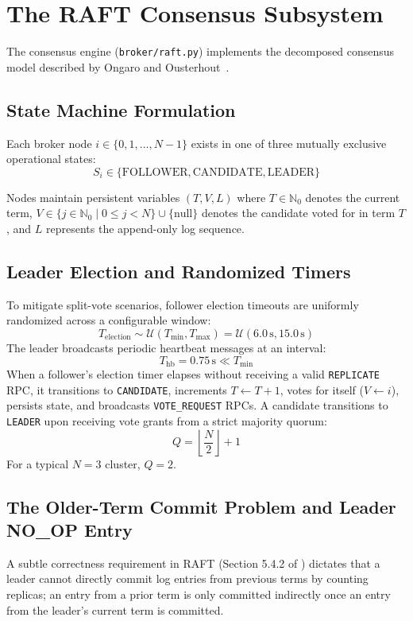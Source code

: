 \documentclass[11pt,a4paper]{article}
\begin{document}
\section{The RAFT Consensus Subsystem}
\label{sec:raft}
The consensus engine (\texttt{broker/raft.py}) implements the decomposed consensus model described by Ongaro and Ousterhout~\cite{ongaro2014raft}.

\subsection{State Machine Formulation}
Each broker node $i \in \{0, 1, \dots, N-1\}$ exists in one of three mutually exclusive operational states:
\begin{equation}
S_i \in \{\text{FOLLOWER}, \text{CANDIDATE}, \text{LEADER}\}
\end{equation}

Nodes maintain persistent variables $(T, V, L)$ where $T \in \mathbb{N}_0$ denotes the current term, $V \in \{j \in \mathbb{N}_0 \mid 0 \le j < N\} \cup \{\text{null}\}$ denotes the candidate voted for in term $T$, and $L$ represents the append-only log sequence.

\subsection{Leader Election and Randomized Timers}
To mitigate split-vote scenarios, follower election timeouts are uniformly randomized across a configurable window:
\begin{equation}
T_{\text{election}} \sim \mathcal{U}(T_{\min}, T_{\max}) = \mathcal{U}(6.0\,\text{s}, 15.0\,\text{s})
\end{equation}
The leader broadcasts periodic heartbeat messages at an interval:
\begin{equation}
T_{\text{hb}} = 0.75\,\text{s} \ll T_{\min}
\end{equation}
When a follower's election timer elapses without receiving a valid \texttt{REPLICATE} RPC, it transitions to \texttt{CANDIDATE}, increments $T \leftarrow T + 1$, votes for itself ($V \leftarrow i$), persists state, and broadcasts \texttt{VOTE\_REQUEST} RPCs. A candidate transitions to \texttt{LEADER} upon receiving vote grants from a strict majority quorum:
\begin{equation}
Q = \left\lfloor \frac{N}{2} \right\rfloor + 1
\end{equation}
For a typical $N=3$ cluster, $Q=2$.

\subsection{The Older-Term Commit Problem and Leader NO\_OP Entry}
A subtle correctness requirement in RAFT (Section 5.4.2 of \cite{ongaro2014raft}) dictates that a leader cannot directly commit log entries from previous terms by counting replicas; an entry from a prior term is only committed indirectly once an entry from the leader's current term is committed. 
\end{document}
